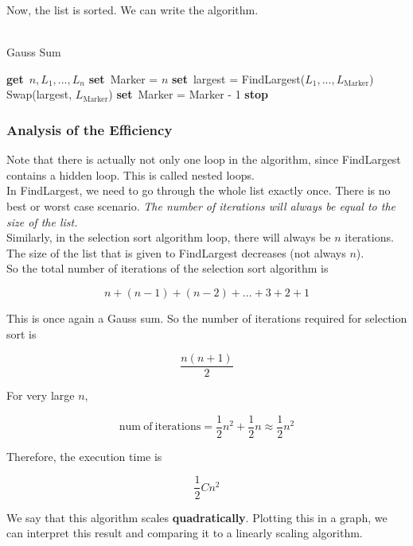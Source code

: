 \documentclass[]{article}
\newcommand{\Get}{\State \textbf{get}~}
\newcommand{\Set}{\State \textbf{set}~}
\newcommand{\Stop}{\State \textbf{stop}~}
\begin{document}
\bigbreak\bigbreak
Now, the list is sorted. We can write the algorithm.\\


\begin{algorithm}
	\caption{\\Gauss Sum}
	\begin{algorithmic}[1]
		\Get $n, L_1, ..., L_n$
		\Set Marker = $n$
			\Set largest = FindLargest($L_1, ..., L_{\mathrm{Marker}}$)
			\State Swap(largest, $L_{\mathrm{Marker}}$)
			\Set Marker = Marker - 1
		\EndWhile
		\Stop
	\end{algorithmic}
\end{algorithm}

\subsubsection{Analysis of the Efficiency}
\bigbreak

Note that there is actually not only one loop in the algorithm, since FindLargest contains a hidden loop. This is called nested loops.\\

In FindLargest, we need to go through the whole list exactly once. There is no best or worst case scenario. \textit{The number of iterations will always be equal to the size of the list.}\\

Similarly, in the selection sort algorithm loop, there will always be $n$ iterations. The size of the list that is given to FindLargest decreases (not always $n$).\\

So the total number of iterations of the selection sort algorithm is 

\[ n + (n-1) + (n-2) + ... + 3 + 2 + 1\]

This is once again a Gauss sum. So the number of iterations required for selection sort is

\[\frac{n(n+1)}{2}\]


For very large $n$, 

\[\mathrm{num~of~iterations} = \frac{1}{2}n^2 + \frac{1}{2}n \approx \frac{1}{2}n^2\]

Therefore, the execution time is 

\[\frac{1}{2}Cn^2\]

We say that this algorithm scales \textbf{quadratically}. Plotting this in a graph, we can interpret this result and comparing it to a linearly scaling algorithm.
\end{document}
